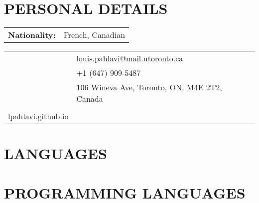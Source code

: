 \documentclass{ResumeTemplate}
\begin{document}
	\noindent\begin{minipage}[c]{0.33\linewidth}
		\centering


		
		\section{PERSONAL DETAILS}
		
		\noindent\begin{tabularx}{\linewidth}{lX}
		   \textbf{Nationality:} & French, Canadian
		\end{tabularx}
		
		\noindent\begin{tabularx}{\linewidth}{lX}
		   \emailsymbol    &  louis.pahlavi@mail.utoronto.ca\\
		   \phonesymbol    & +1 (647) 909-5487 \\
		   \mailsymbol     & 106 Wineva Ave, Toronto, ON, M4E 2T2, Canada \\
		   \homepagesymbol & \href{https:\\lpahlavi.github.io}{lpahlavi.github.io}
		\end{tabularx}
		
		

		\section{LANGUAGES}


		\section{PROGRAMMING LANGUAGES}

	\end{minipage}
	
\end{document}
